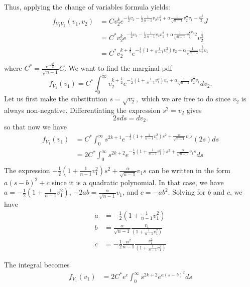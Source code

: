 \documentclass[11pt]{article} %
\begin{document}
Thus, applying the change of variables formula yields: 
\begin{align*}
f_{V_1 V_2} (v_1, v_2)  & = C v_2^ k e^{-\frac{1}{2}v_2 - \frac{1}2 \frac{1}{n-1} v_2 v_1^2 + \alpha \frac{1}{\sqrt{n-1}}v_2^{\frac{1}2} v_1 - \frac{ \alpha^2}{2}}J\\
& = C^* v_2^ k e^{-\frac{1}{2}v_2 - \frac{1}2 \frac{1}{n-1} v_2 v_1^2 + \alpha \frac{1}{\sqrt{n-1}}v_2^{\frac{1}{2} v_1}{2}}v_2^{\frac{1}2}\\
& = C^* v_2^ {k+\frac{1}2} e^{-\frac{1}{2}(1+ \frac{1}{n-1}v_1^2  )v_2 + \alpha \frac{1}{\sqrt{n-1}}v_2^{\frac{1}2} v_1 }\\
\end{align*}
where $C^* = \frac{e^{ - \frac{ \alpha^2}2}}{\sqrt{n-1}}C$. We want to find the marginal pdf $$f_{V_1}(v_1) = C^* \int_{0}^{\infty}v_2^ {k+\frac{1}2} e^{-\frac{1}{2}(1+ \frac{1}{n-1}v_1^2  )v_2 + \alpha \frac{1}{\sqrt{n-1}}v_2^{\frac{1}2} v_1 } dv_2.$$
Let us first make the substitution $s = \sqrt{v_2},$ which we are free to do since $v_2$ is always non-negative. Differentiating the expression $s^2 = v_2$ gives $$2s ds = dv_2.$$ so that now we have 
\begin{align*}
f_{V_1}(v_1) &= C^* \int_{0}^{\infty}s^ {2k+1} e^{-\frac{1}{2}(1+ \frac{1}{n-1}v_1^2  )s^2 + \frac{\alpha}{\sqrt{n-1}} v_1 s } (2s) ds\\
&= 2C^* \int_{0}^{\infty}s^ {2k+2} e^{-\frac{1}{2}(1+ \frac{1}{n-1}v_1^2  )s^2 + \frac{\alpha}{\sqrt{n-1}} v_1 s } ds\\
\end{align*}
The expression $-\frac{1}{2}(1+ \frac{1}{n-1}v_1^2  )s^2 + \frac{\alpha}{\sqrt{n-1}} v_1 s $ can be written in the form $a (s - b)^2 + c$ since it is a quadratic polynomial. In that case, we have $a = -\frac{1}{2}(1+ \frac{1}{n-1}v_1^2  )$, $-2 a b = \frac{\alpha}{\sqrt{n-1}} v_1$, and $c =- a b^2$.  Solving for $b$ and $c$, we have 
\begin{align*}
a &= -\frac{1}{2}(1+ \frac{1}{n-1}v_1^2  )\\
b & =  \frac{\alpha}{\sqrt{n-1}}\frac{ v_1}{(1+ \frac{1}{n-1}v_1^2  )} \\
c & = -\frac{1}{2}\frac{\alpha^2}{n-1}\frac{ v_1^2}{(1+ \frac{1}{n-1}v_1^2  )}
\end{align*}

The integral becomes 
\begin{align*}
f_{V_1}(v_1) &= 2C^* e^c \int_{0}^{\infty}s^ {2k+2} e^{a (s - b)^2 } ds\\
\end{align*}
\end{document}
